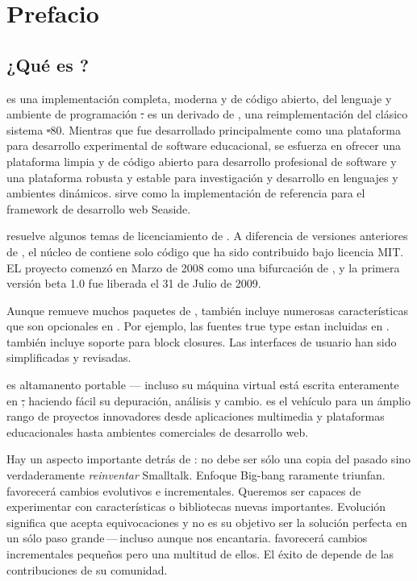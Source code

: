 \documentclass[a4paper,spanish, 10pt,twoside]{book}
\begin{document}
	\sloppy
	\frontmatter
\fi
\chapter{Prefacio}

\section*{¿Qué es \pharo?}

\pharo es una implementación completa, moderna y de código abierto, del lenguaje y ambiente de programación \st. \pharo es un derivado de \squeak\cite{Inga97a}, una reimplementación del clásico sistema \st-80. Mientras que \squeak fue desarrollado principalmente como una plataforma para desarrollo experimental de software educacional, \pharo se esfuerza en ofrecer una plataforma limpia y de código abierto para desarrollo profesional de software y una plataforma robusta y estable para investigación y desarrollo en lenguajes y ambientes dinámicos. \pharo sirve como la implementación de referencia para el framework de desarrollo web Seaside.

\pharo resuelve algunos temas de licenciamiento de \squeak. A diferencia de versiones anteriores de \squeak, el núcleo de \pharo contiene solo código que ha sido contribuido bajo licencia MIT. EL proyecto \pharo comenzó en Marzo de 2008 como una bifurcación de , y la primera versión beta 1.0 fue liberada el 31 de Julio de 2009.


Aunque \pharo remueve muchos paquetes de \squeak, también incluye numerosas características que son opcionales en \squeak. Por ejemplo, las fuentes true type estan incluidas en \pharo. \pharo también incluye soporte para block closures. Las interfaces de usuario han sido simplificadas y revisadas.

\pharo es altamanento portable --- incluso su máquina virtual está escrita enteramente en \st, haciendo fácil su depuración, análisis y cambio. \pharo es el vehículo para un ámplio rango de proyectos innovadores desde aplicaciones multimedia y plataformas educacionales hasta ambientes comerciales de desarrollo web. 

Hay un aspecto importante detrás de \pharo: \pharo no debe ser sólo una copia del pasado sino verdaderamente \emph{reinventar} Smalltalk. Enfoque Big-bang raramente triunfan. \pharo favorecerá  cambios evolutivos e incrementales. Queremos ser capaces de experimentar con características o bibliotecas nuevas importantes. Evolución significa que \pharo acepta equivocaciones y no es su objetivo ser la solución perfecta en un sólo paso grande\,---\,incluso aunque nos encantaria. \pharo favorecerá cambios incrementales pequeños pero una multitud de ellos. El éxito de \pharo depende de las contribuciones de su comunidad.
\end{document}
